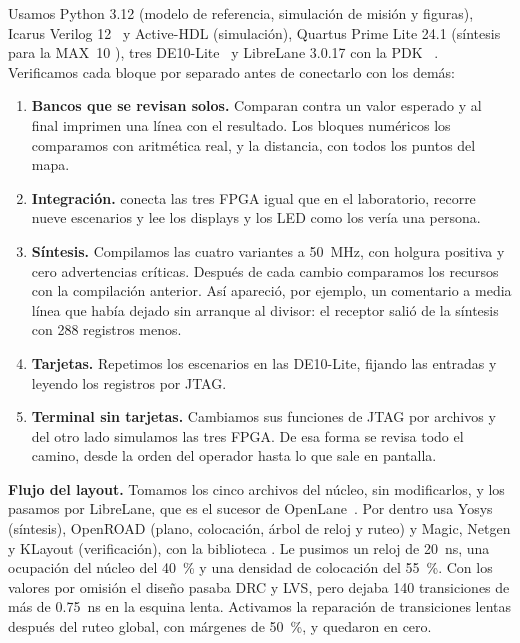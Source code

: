 Usamos Python 3.12 (modelo de referencia, simulación de misión y figuras), Icarus Verilog 12~\cite{icarus} y Active-HDL
(simulación), Quartus Prime Lite 24.1 (síntesis para la MAX~10 ), tres DE10-Lite~\cite{terasic} y
LibreLane 3.0.17 con la PDK ~\cite{librelane,skywater}. Verificamos cada bloque por separado antes de
conectarlo con los demás:
\begin{enumerate}
    \item \textbf{Bancos que se revisan solos.} Comparan contra un valor esperado y al final imprimen una línea con el resultado. Los
        bloques numéricos los comparamos con aritmética real, y la distancia, con todos los puntos del mapa.
  \item \textbf{Integración.}  conecta las tres FPGA igual que en el laboratorio, recorre nueve escenarios y lee los
        displays y los LED como los vería una persona.
  \item \textbf{Síntesis.} Compilamos las cuatro variantes a 50~MHz, con holgura positiva y cero advertencias críticas. Después de cada
        cambio comparamos los recursos con la compilación anterior. Así apareció, por ejemplo, un comentario a media línea que había
        dejado sin arranque al divisor: el receptor salió de la síntesis con 288 registros menos.
  \item \textbf{Tarjetas.} Repetimos los escenarios en las DE10-Lite, fijando las entradas y leyendo los registros por JTAG.
  \item \textbf{Terminal sin tarjetas.} Cambiamos sus funciones de JTAG por archivos y del otro lado simulamos las tres FPGA. De esa
        forma se revisa todo el camino, desde la orden del operador hasta lo que sale en pantalla.
\end{enumerate}

\textbf{Flujo del layout.}\label{sec:flujo-layout} Tomamos los cinco archivos del núcleo, sin modificarlos, y los pasamos por LibreLane, que es el sucesor de OpenLane~\cite{shalan2020}.
Por dentro usa Yosys (síntesis), OpenROAD (plano, colocación, árbol de reloj y ruteo) y Magic, Netgen y KLayout (verificación), con la
biblioteca . Le pusimos un reloj de 20~ns, una ocupación del núcleo del 40~\% y una densidad de colocación del
55~\%. Con los valores por omisión el diseño pasaba DRC y LVS, pero dejaba 140 transiciones de más de 0.75~ns en la esquina lenta.
Activamos la reparación de transiciones lentas después del ruteo global, con márgenes de 50~\%, y quedaron en cero.
